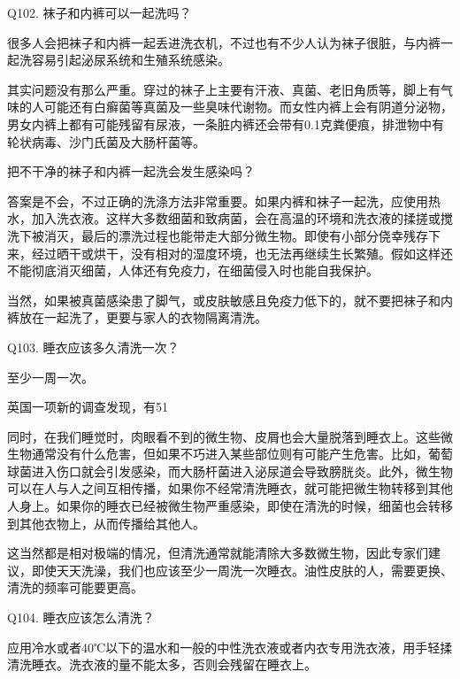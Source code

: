 \documentclass[12pt,UTF8]{ctexbook}
\begin{document}
Q102. 袜子和内裤可以一起洗吗？


很多人会把袜子和内裤一起丢进洗衣机，不过也有不少人认为袜子很脏，与内裤一起洗容易引起泌尿系统和生殖系统感染。

其实问题没有那么严重。穿过的袜子上主要有汗液、真菌、老旧角质等，脚上有气味的人可能还有白癣菌等真菌及一些臭味代谢物。而女性内裤上会有阴道分泌物，男女内裤上都有可能残留有尿液，一条脏内裤还会带有0.1克粪便痕，排泄物中有轮状病毒、沙门氏菌及大肠杆菌等。

把不干净的袜子和内裤一起洗会发生感染吗？

答案是不会，不过正确的洗涤方法非常重要。如果内裤和袜子一起洗，应使用热水，加入洗衣液。这样大多数细菌和致病菌，会在高温的环境和洗衣液的揉搓或搅洗下被消灭，最后的漂洗过程也能带走大部分微生物。即使有小部分侥幸残存下来，经过晒干或烘干，没有相对的湿度环境，也无法再继续生长繁殖。假如这样还不能彻底消灭细菌，人体还有免疫力，在细菌侵入时也能自我保护。

当然，如果被真菌感染患了脚气，或皮肤敏感且免疫力低下的，就不要把袜子和内裤放在一起洗了，更要与家人的衣物隔离清洗。





Q103. 睡衣应该多久清洗一次？


至少一周一次。

英国一项新的调查发现，有51%

同时，在我们睡觉时，肉眼看不到的微生物、皮屑也会大量脱落到睡衣上。这些微生物通常没有什么危害，但如果不巧进入某些部位则有可能产生危害。比如，葡萄球菌进入伤口就会引发感染，而大肠杆菌进入泌尿道会导致膀胱炎。此外，微生物可以在人与人之间互相传播，如果你不经常清洗睡衣，就可能把微生物转移到其他人身上。如果你的睡衣已经被微生物严重感染，即使在清洗的时候，细菌也会转移到其他衣物上，从而传播给其他人。

这当然都是相对极端的情况，但清洗通常就能清除大多数微生物，因此专家们建议，即使天天洗澡，我们也应该至少一周洗一次睡衣。油性皮肤的人，需要更换、清洗的频率可能要更高。





Q104. 睡衣应该怎么清洗？


应用冷水或者40℃以下的温水和一般的中性洗衣液或者内衣专用洗衣液，用手轻揉清洗睡衣。洗衣液的量不能太多，否则会残留在睡衣上。
\end{document}
